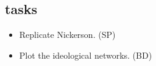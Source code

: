 \documentclass[12pt]{article}
\begin{document}
\subsection{tasks}
\begin{itemize}
\item Replicate Nickerson. (SP)
\item Plot the ideological networks. (BD)
\end{itemize}






\end{document}
